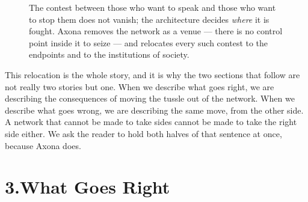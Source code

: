 \documentclass[nobib,justified]{tufte-handout}
\begin{document}
\begin{figure}[h]
\centering
{}
\caption[Relocating the tussle]{The contest between those who want to speak and
those who want to stop them does not vanish; the architecture decides
\emph{where} it is fought. Axona removes the network as a venue --- there is no
control point inside it to seize --- and relocates every such contest to the
endpoints and to the institutions of society.}
\label{fig:tussle}
\end{figure}

This relocation is the whole story, and it is why the two sections that follow
are not really two stories but one. When we describe what goes right, we are
describing the consequences of moving the tussle out of the network. When we
describe what goes wrong, we are describing the same move, from the other side.
A network that cannot be made to take sides cannot be made to take the right side
either. We ask the reader to hold both halves of that sentence at once, because
Axona does.

\section{3.\quad What Goes Right}
\end{document}
